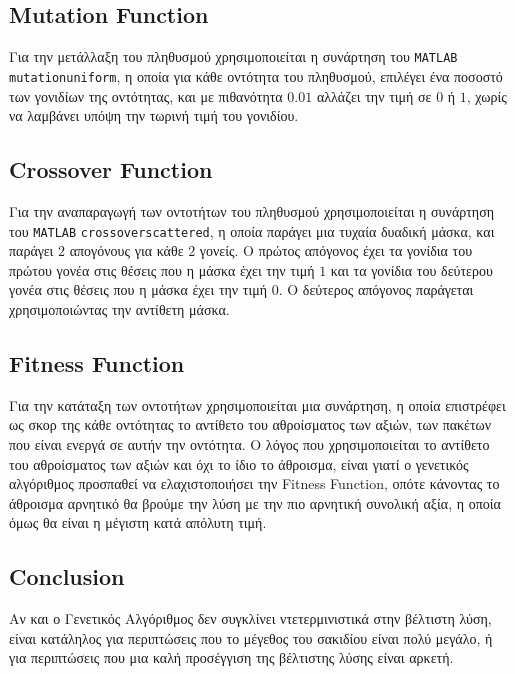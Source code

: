 \documentclass{article}
\begin{document}
\subsection{Mutation Function}

Για την μετάλλαξη του πληθυσμού χρησιμοποιείται η συνάρτηση του \verb|MATLAB|
\verb|mutationuniform|, η οποία για κάθε οντότητα του πληθυσμού, επιλέγει ένα ποσοστό
των γονιδίων της οντότητας, και με πιθανότητα $0.01$ αλλάζει την τιμή σε $0$ ή
$1$, χωρίς να λαμβάνει υπόψη την τωρινή τιμή του γονιδίου.

\subsection{Crossover Function}

Για την αναπαραγωγή των οντοτήτων του πληθυσμού χρησιμοποιείται η συνάρτηση του
\verb|MATLAB| \verb|crossoverscattered|, η οποία παράγει μια τυχαία δυαδική μάσκα, και
παράγει $2$ απογόνους για κάθε $2$ γονείς. Ο πρώτος απόγονος έχει τα γονίδια του
πρώτου γονέα στις θέσεις που η μάσκα έχει την τιμή $1$ και τα γονίδια του
δεύτερου γονέα στις θέσεις που η μάσκα έχει την τιμή $0$. Ο δεύτερος απόγονος
παράγεται χρησιμοποιώντας την αντίθετη μάσκα.

\subsection{Fitness Function}

Για την κατάταξη των οντοτήτων χρησιμοποιείται μια συνάρτηση, η οποία επιστρέφει
ως σκορ της κάθε οντότητας το αντίθετο του αθροίσματος των αξιών, των πακέτων
που είναι ενεργά σε αυτήν την οντότητα. Ο λόγος που χρησιμοποιείται το αντίθετο
του αθροίσματος των αξιών και όχι το ίδιο το άθροισμα, είναι γιατί ο γενετικός
αλγόριθμος προσπαθεί να ελαχιστοποιήσει την Fitness Function, οπότε κάνοντας το
άθροισμα αρνητικό θα βρούμε την λύση με την πιο αρνητική συνολική αξία, η οποία
όμως θα είναι η μέγιστη κατά απόλυτη τιμή.

\subsection{Conclusion}

Αν και ο Γενετικός Αλγόριθμος δεν συγκλίνει ντετερμινιστικά στην βέλτιστη λύση,
είναι κατάληλος για περιπτώσεις που το μέγεθος του σακιδίου είναι πολύ μεγάλο, ή
για περιπτώσεις που μια καλή προσέγγιση της βέλτιστης λύσης είναι αρκετή.
\end{document}
